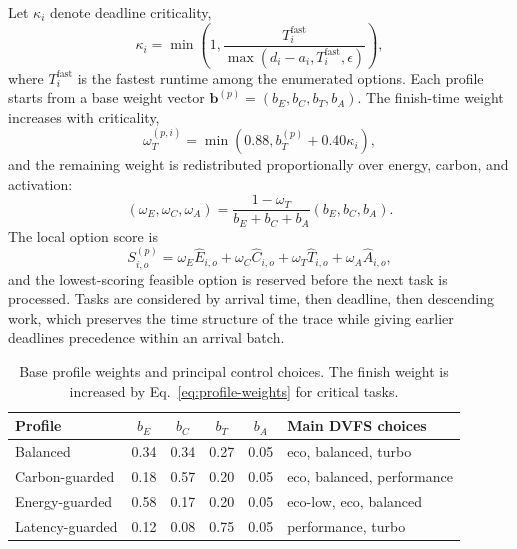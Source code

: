\documentclass[preprint,12pt]{elsarticle}
\begin{document}
Let $\kappa_i$ denote deadline criticality,
\begin{equation}
\kappa_i=\min\left(1,\frac{T^{\mathrm{fast}}_i}{\max(d_i-a_i,T^{\mathrm{fast}}_i,\epsilon)}\right),
\label{eq:criticality}
\end{equation}
where $T^{\mathrm{fast}}_i$ is the fastest runtime among the enumerated options. Each profile starts from a base weight vector $\mathbf{b}^{(p)}=(b_E,b_C,b_T,b_A)$. The finish-time weight increases with criticality,
\begin{equation}
\omega_T^{(p,i)}=\min\left(0.88,b_T^{(p)}+0.40\kappa_i\right),
\end{equation}
and the remaining weight is redistributed proportionally over energy, carbon, and activation:
\begin{equation}
(\omega_E,\omega_C,\omega_A)=
\frac{1-\omega_T}{b_E+b_C+b_A}(b_E,b_C,b_A).
\label{eq:profile-weights}
\end{equation}
The local option score is
\begin{equation}
S_{i,o}^{(p)}=\omega_E \hat{E}_{i,o}+\omega_C \hat{C}_{i,o}+\omega_T \hat{T}_{i,o}+\omega_A \hat{A}_{i,o},
\label{eq:local-score}
\end{equation}
and the lowest-scoring feasible option is reserved before the next task is processed. Tasks are considered by arrival time, then deadline, then descending work, which preserves the time structure of the trace while giving earlier deadlines precedence within an arrival batch.

\begin{table}[t]
\centering
\caption{Base profile weights and principal control choices. The finish weight is increased by Eq.~\eqref{eq:profile-weights} for critical tasks.}
\label{tab:profiles}
\scriptsize
\setlength{\tabcolsep}{3.5pt}
\begin{tabularx}{\linewidth}{lccccY}
\toprule
Profile & $b_E$ & $b_C$ & $b_T$ & $b_A$ & Main DVFS choices \\
\midrule
Balanced & 0.34 & 0.34 & 0.27 & 0.05 & eco, balanced, turbo \\
Carbon-guarded & 0.18 & 0.57 & 0.20 & 0.05 & eco, balanced, performance \\
Energy-guarded & 0.58 & 0.17 & 0.20 & 0.05 & eco-low, eco, balanced \\
Latency-guarded & 0.12 & 0.08 & 0.75 & 0.05 & performance, turbo \\
\bottomrule
\end{tabularx}
\end{table}
\end{document}
